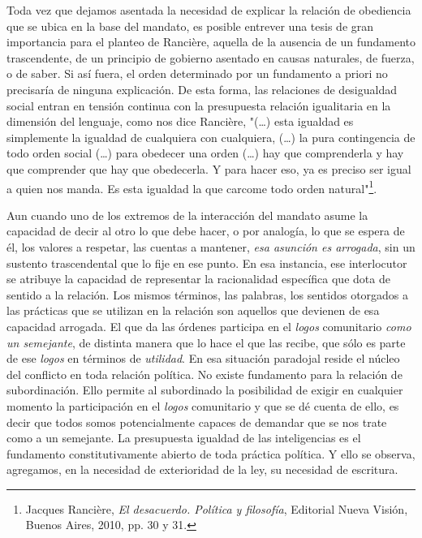 \documentclass{book}
\begin{document}
Toda vez que dejamos asentada la necesidad de explicar la relación de
obediencia que se ubica en la base del mandato, es posible entrever una
tesis de gran importancia para el planteo de Rancière, aquella de la
ausencia de un fundamento trascendente, de un principio de gobierno
asentado en causas naturales, de fuerza, o de saber. Si así fuera, el
orden determinado por un fundamento a priori no precisaría de ninguna
explicación. De esta forma, las relaciones de desigualdad social entran
en tensión continua con la presupuesta relación igualitaria en la
dimensión del lenguaje, como nos dice Rancière, "(\dots) esta
igualdad es simplemente la igualdad de cualquiera con cualquiera,
(\dots) la pura contingencia de todo orden social (\dots) para
obedecer una orden (\dots) hay que comprenderla y hay que
comprender que hay que obedecerla. Y para hacer eso, ya es preciso ser
igual a quien nos manda. Es esta igualdad la que carcome todo orden
natural"\footnote{Jacques Rancière, \emph{El desacuerdo. Política y
  filosofía}, Editorial Nueva Visión, Buenos Aires, 2010, pp. 30 y 31.}.

Aun cuando uno de los extremos de la interacción del mandato asume la
capacidad de decir al otro lo que debe hacer, o por analogía, lo que se
espera de él, los valores a respetar, las cuentas a mantener, \emph{esa
asunción es arrogada}, sin un sustento trascendental que lo fije en ese
punto. En esa instancia, ese interlocutor se atribuye la capacidad de
representar la racionalidad específica que dota de sentido a la
relación. Los mismos términos, las palabras, los sentidos otorgados a
las prácticas que se utilizan en la relación son aquellos que devienen
de esa capacidad arrogada. El que da las órdenes participa en el
\emph{logos} comunitario \emph{como un semejante}, de distinta manera
que lo hace el que las recibe, que sólo es parte de ese \emph{logos} en
términos de \emph{utilidad}. En esa situación paradojal reside el núcleo
del conflicto en toda relación política. No existe fundamento para la
relación de subordinación. Ello permite al subordinado la posibilidad de
exigir en cualquier momento la participación en el \emph{logos}
comunitario y que se dé cuenta de ello, es decir que todos somos
potencialmente capaces de demandar que se nos trate como a un semejante.
La presupuesta igualdad de las inteligencias es el fundamento
constitutivamente abierto de toda práctica política. Y ello se observa,
agregamos, en la necesidad de exterioridad de la ley, su necesidad de
escritura.
\end{document}
